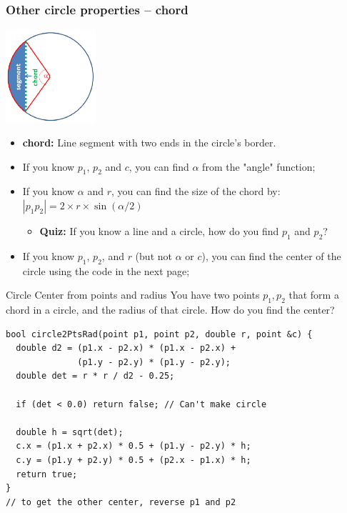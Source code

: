 \begin{frame}
  \frametitle{Other circle properties -- chord}
  \centering
    \includegraphics[width=0.25\textwidth]{../img/circle_halim1}

  \begin{itemize}
  \item {\bf chord:} Line segment with two ends in the circle's border.
  \item If you know $p_1$, $p_2$ and $c$, you can find $\alpha$ from the "angle" function;
  \item If you know $\alpha$ and $r$, you can find the size of the chord by: $|p_1p_2| = 2\times r\times\sin(\alpha/2)$
  \begin{itemize}
    \item {\bf Quiz:} If you know a line and a circle, how do you find $p_1$ and $p_2$?
  \end{itemize}
  \item If you know $p_1$, $p_2$, and $r$ (but not $\alpha$ or $c$), you can find the center of the circle using the code in the next page;
  \end{itemize}
\end{frame}

\begin{frame}[fragile]{Circle Center from points and radius}
  You have two points $p_1, p_2$ that form a chord in a circle, and the radius of that circle. How do you find the center?

  {\smaller
\begin{exampleblock}{}
\begin{verbatim}
bool circle2PtsRad(point p1, point p2, double r, point &c) {
  double d2 = (p1.x - p2.x) * (p1.x - p2.x) +
              (p1.y - p2.y) * (p1.y - p2.y);
  double det = r * r / d2 - 0.25;

  if (det < 0.0) return false; // Can't make circle

  double h = sqrt(det);
  c.x = (p1.x + p2.x) * 0.5 + (p1.y - p2.y) * h;
  c.y = (p1.y + p2.y) * 0.5 + (p2.x - p1.x) * h;
  return true;
}
// to get the other center, reverse p1 and p2
\end{verbatim}
\end{exampleblock}
  }
\end{frame}

